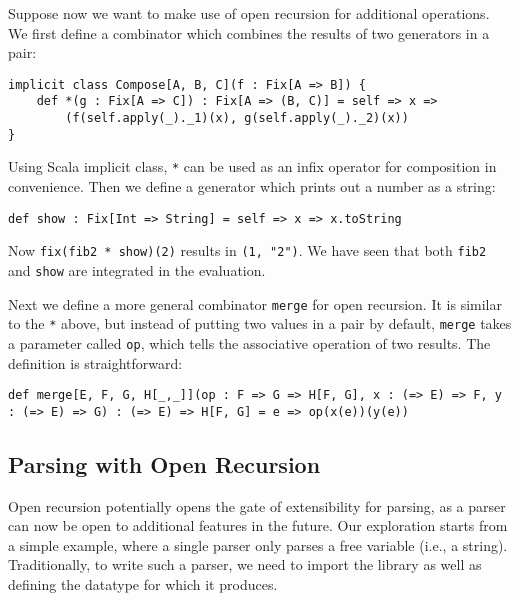Suppose now we want to make use of open recursion for additional operations. We first define a combinator which combines the results of two generators in a pair:
\begin{lstlisting}
implicit class Compose[A, B, C](f : Fix[A => B]) {
    def *(g : Fix[A => C]) : Fix[A => (B, C)] = self => x =>
        (f(self.apply(_)._1)(x), g(self.apply(_)._2)(x))
}
\end{lstlisting}
Using Scala implicit class, \lstinline{*} can be used as an infix operator for composition in convenience.
Then we define a generator which prints out a number as a string:
\begin{lstlisting}
def show : Fix[Int => String] = self => x => x.toString
\end{lstlisting}
Now \lstinline{fix(fib2 * show)(2)} results in \lstinline{(1, "2")}. We have seen that both \lstinline{fib2} and \lstinline{show} are integrated in the evaluation.

Next we define a more general combinator \lstinline{merge} for open recursion. It is similar to the \lstinline{*} above, but instead of putting two values in a pair by default, \lstinline{merge} takes a parameter called \lstinline{op}, which tells the associative operation of two results. The definition is straightforward:
\begin{lstlisting}
def merge[E, F, G, H[_,_]](op : F => G => H[F, G], x : (=> E) => F, y : (=> E) => G) : (=> E) => H[F, G] = e => op(x(e))(y(e))
\end{lstlisting}



\subsection{Parsing with Open Recursion}\label{subsec:parsingwithopen}
Open recursion potentially opens the gate of extensibility for parsing, as a parser can now be open to additional features in the future.
Our exploration starts from a simple example, where a single parser only parses a free variable (i.e., a string). Traditionally, to write
such a parser, we need to import the library as
well as defining the datatype for which it produces.

